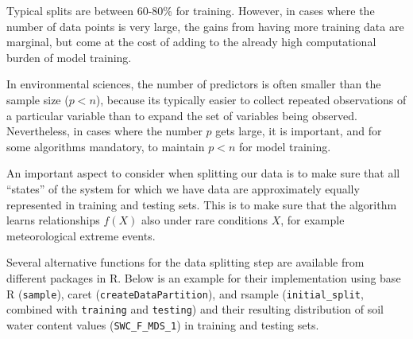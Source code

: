 \documentclass[
]{book}
\begin{document}
Typical splits are between 60-80\% for training. However, in cases where the number of data points is very large, the gains from having more training data are marginal, but come at the cost of adding to the already high computational burden of model training.

In environmental sciences, the number of predictors is often smaller than the sample size (\(p < n\)), because its typically easier to collect repeated observations of a particular variable than to expand the set of variables being observed. Nevertheless, in cases where the number \(p\) gets large, it is important, and for some algorithms mandatory, to maintain \(p < n\) for model training.

An important aspect to consider when splitting our data is to make sure that all ``states'' of the system for which we have data are approximately equally represented in training and testing sets. This is to make sure that the algorithm learns relationships \(f(X)\) also under rare conditions \(X\), for example meteorological extreme events.

Several alternative functions for the data splitting step are available from different packages in R. Below is an example for their implementation using base R (\texttt{sample}), caret (\texttt{createDataPartition}), and rsample (\texttt{initial\_split}, combined with \texttt{training} and \texttt{testing}) and their resulting distribution of soil water content values (\texttt{SWC\_F\_MDS\_1}) in training and testing sets.
\end{document}

